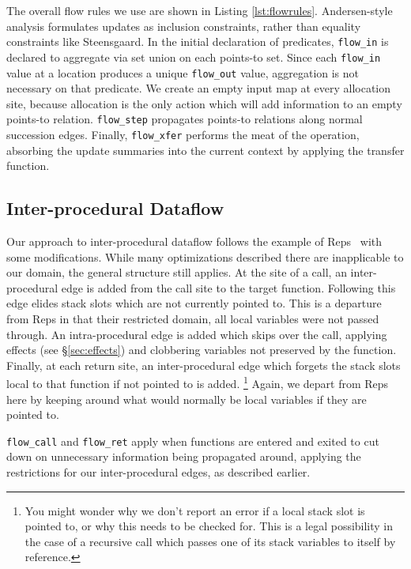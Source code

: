 The overall flow rules we use are shown in  Listing \ref{lst:flowrules}.
Andersen-style analysis formulates updates as inclusion constraints, rather than equality constraints like Steensgaard.
In the initial declaration of predicates, \texttt{flow\_in} is declared to aggregate via set union on each points-to set.
Since each \texttt{flow\_in} value at a location produces a unique \texttt{flow\_out} value, aggregation is not necessary on that predicate.
We create an empty input map at every allocation site, because allocation is the only action which will add information to an empty points-to relation.
\texttt{flow\_step} propagates points-to relations along normal succession edges.
Finally, \texttt{flow\_xfer} performs the meat of the operation, absorbing the update summaries into the current context by applying the transfer function.

\subsection{Inter-procedural Dataflow}
\label{sec:interproc}
Our approach to inter-procedural dataflow follows the example of Reps~\cite{interproc-dataflow} with some modifications.
While many optimizations described there are inapplicable to our domain, the general structure still applies.
At the site of a call, an inter-procedural edge is added from the call site to the target function.
Following this edge elides stack slots which are not currently pointed to.
This is a departure from Reps in that their restricted domain, all local variables were not passed through.
An intra-procedural edge is added which skips over the call, applying effects (see \S \ref{sec:effects}) and clobbering variables not preserved by the function.
Finally, at each return site, an inter-procedural edge which forgets the stack slots local to that function if not pointed to is added.
\footnote{You might wonder why we don't report an error if a local stack slot is pointed to, or why this needs to be checked for. This is a legal possibility in the case of a recursive call which passes one of its stack variables to itself by reference.}
Again, we depart from Reps here by keeping around what would normally be local variables if they are pointed to.

\texttt{flow\_call} and \texttt{flow\_ret} apply when functions are entered and exited to cut down on unnecessary information being propagated around, applying the restrictions for our inter-procedural edges, as described earlier.

